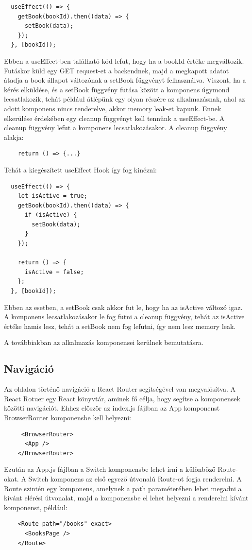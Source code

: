 \begin{lstlisting}
  useEffect(() => {
    getBook(bookId).then((data) => {
      setBook(data);
    });
  }, [bookId]);
\end{lstlisting}

Ebben a useEffect-ben található kód lefut, hogy ha a bookId értéke megváltozik. Futáskor küld egy GET request-et a backendnek, majd a megkapott adatot átadja a book állapot változónak a setBook függvényt felhasználva. Viszont, ha a kérés elküldése, és a setBook függvény futása között a komponens úgymond lecsatlakozik, tehát például átlépünk egy olyan részére az alkalmazásnak, ahol az adott komponens nincs renderelve, akkor memory leak-et kapunk. Ennek elkerülése érdekében egy cleanup függvényt kell tennünk a useEffect-be. A cleanup függvény lefut a komponens lecsatlakozásakor. A cleanup függvény alakja:

\begin{lstlisting}
    return () => {...}
\end{lstlisting}
Tehát a kiegészített useEffect Hook így fog kinézni:
\begin{lstlisting}
  useEffect(() => {
    let isActive = true;
    getBook(bookId).then((data) => {
      if (isActive) {
        setBook(data);
      }
    });

    return () => {
      isActive = false;
    };
  }, [bookId]);
\end{lstlisting}
Ebben az esetben, a setBook csak akkor fut le, hogy ha az isActive változó igaz. A komponens lecsatlakozásakor le fog futni a cleanup függvény, tehát az isActive értéke hamis lesz, tehát a setBook nem fog lefutni, így nem lesz memory leak.

\bigskip

A továbbiakban az alkalmazás komponensei kerülnek bemutatásra.

\subsection{Navigáció}
Az oldalon történő navigáció a React Router segítségével van megvalósítva. A React Rotuer egy React könyvtár, aminek fő célja, hogy segítse a komponensek közötti navigációt. Ehhez először az index.js fájlban az App komponenst BrowserRouter komponensbe kell helyezni:  
\begin{lstlisting}
     <BrowserRouter>
      <App />
    </BrowserRouter>     
\end{lstlisting}

Ezután az App.js fájlban a Switch komponensbe lehet írni a különböző Route-okat. A Switch komponens az első egyező útvonalú Route-ot fogja renderelni. A Route szintén egy komponens, amelynek a path paraméterében lehet megadni a kívánt elérési útvonalat, majd a komponensbe el lehet helyezni a renderelni kívánt komponenst, például: 
\begin{lstlisting}
    <Route path="/books" exact>
      <BooksPage />
    </Route>    
\end{lstlisting}

